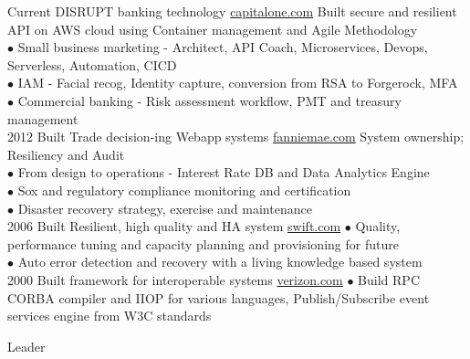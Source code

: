 \documentclass[]{friggeri-cv}
\begin{document}
\begin{entrylist}
  \entry
    {Current}
    {DISRUPT banking technology}
    {\href{http://www.capitalone.com}{capitalone.com}}
    {Built secure and resilient API on AWS cloud using Container management and Agile Methodology\\
    $\bullet$ Small business marketing - Architect, API Coach, Microservices, Devops, Serverless, Automation, CICD \\
    $\bullet$ IAM - Facial recog, Identity capture, conversion from RSA to Forgerock, MFA\\
    $\bullet$ Commercial banking - Risk assessment workflow, PMT and treasury management \\} 
  \entry
    {2012}
    {Built Trade decision-ing Webapp systems}
    {\href{http://www.fanniemae.com}{fanniemae.com}}
    {System ownership; Resiliency and Audit\\
    $\bullet$ From design to operations - Interest Rate DB and Data Analytics Engine \\
    $\bullet$ Sox and regulatory compliance monitoring and certification\\
    $\bullet$ Disaster recovery strategy, exercise and maintenance\\}
  \entry
    {2006}
    {Built Resilient, high quality and HA system}
    {\href{http://www.swift.com}{swift.com}}
    {$\bullet$ Quality, performance tuning and capacity planning and provisioning for future\\
     $\bullet$ Auto error detection and recovery with a living knowledge based system\\}
  \entry
    {2000}
    {Built framework for interoperable systems}
    {\href{http://www.verizon.com}{verizon.com}}
    {$\bullet$ Build RPC CORBA compiler and IIOP for various languages, Publish/Subscribe event services engine from W3C standards\\}
\end{entrylist}

\newpage
{}
      {Leader}

\end{document}
